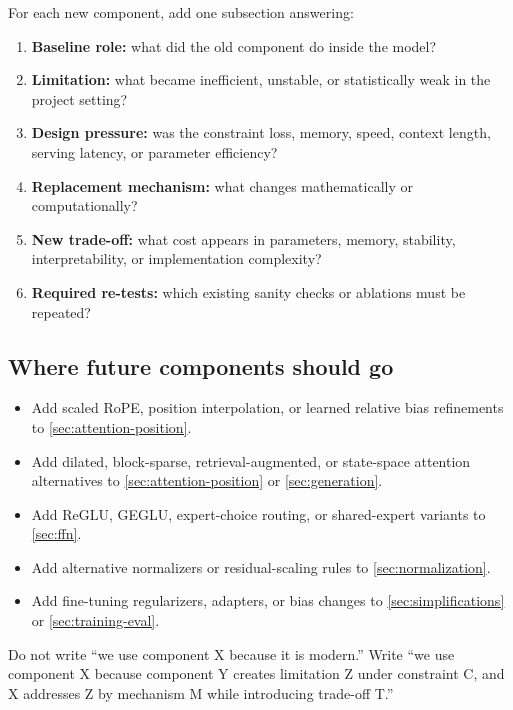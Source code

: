\documentclass[11pt,a4paper]{article}
\theoremstyle{definition}
\theoremstyle{plain}
\begin{document}
For each new component, add one subsection answering:
\begin{enumerate}[nosep]
    \item \textbf{Baseline role:} what did the old component do inside the model?
    \item \textbf{Limitation:} what became inefficient, unstable, or statistically weak in the project setting?
    \item \textbf{Design pressure:} was the constraint loss, memory, speed, context length, serving latency, or parameter efficiency?
    \item \textbf{Replacement mechanism:} what changes mathematically or computationally?
    \item \textbf{New trade-off:} what cost appears in parameters, memory, stability, interpretability, or implementation complexity?
    \item \textbf{Required re-tests:} which existing sanity checks or ablations must be repeated?
\end{enumerate}

\subsection{Where future components should go}

\begin{itemize}[nosep]
    \item Add scaled RoPE, position interpolation, or learned relative bias refinements to \cref{sec:attention-position}.
    \item Add dilated, block-sparse, retrieval-augmented, or state-space attention alternatives to \cref{sec:attention-position} or \cref{sec:generation}.
    \item Add ReGLU, GEGLU, expert-choice routing, or shared-expert variants to \cref{sec:ffn}.
    \item Add alternative normalizers or residual-scaling rules to \cref{sec:normalization}.
    \item Add fine-tuning regularizers, adapters, or bias changes to \cref{sec:simplifications} or \cref{sec:training-eval}.
\end{itemize}

\begin{motivationbox}
Do not write ``we use component X because it is modern.'' Write ``we use component X because component Y creates limitation Z under constraint C, and X addresses Z by mechanism M while introducing trade-off T.''
\end{motivationbox}
\end{document}
